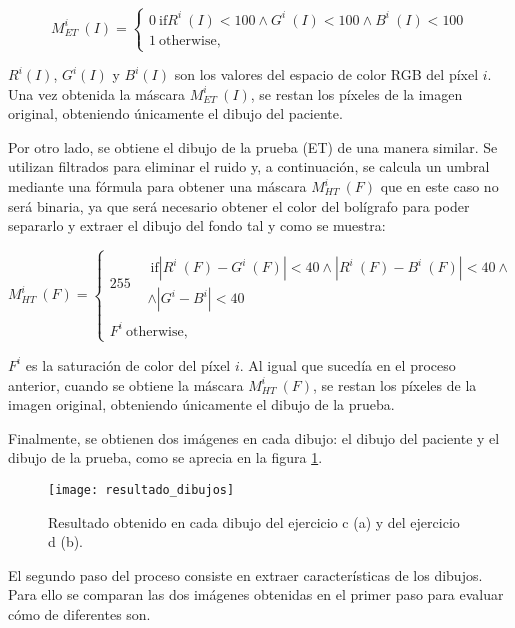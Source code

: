 \begin{equation}
	M^{i}_{ET}\ (I) = \left\lbrace\begin{array}{ll}
0~\text{if}R^{i}~(I)<100\wedge G^{i}~(I)<100\wedge B^{i}~(I)<100 \\ 1~\text{otherwise,} \end{array}\right.
\end{equation}

\(R^{i}(I)\), \(G^{i}(I)\) y \(B^{i}(I)\) son los valores del espacio de color RGB del píxel \(i\). Una vez obtenida la máscara \(M^{i}_{ET}\ (I)\), se restan los píxeles de la imagen original, obteniendo únicamente el dibujo del paciente.

Por otro lado, se obtiene el dibujo de la prueba (ET) de una manera similar. Se utilizan filtrados para eliminar el ruido y, a continuación, se calcula un umbral mediante una fórmula para obtener una máscara \(M^{i}_{HT}\ (F)\) que en este caso no será binaria, ya que será necesario obtener el color del bolígrafo para poder separarlo y extraer el dibujo del fondo tal y como se muestra:
 
\begin{equation}
	M^{i}_{HT}\ (F) = \left\lbrace\begin{array}{ll}
		255\begin{split}&~\text{if}|R^{i}~(F)-G^{i}~(F)|<40\wedge |R^{i}~(F)-B^{i}~(F)|<40\wedge \\ & \wedge|G^{i}-B^{i}|<40 \end{split} \\ F^i~\text{otherwise,} \end{array}\right.
\end{equation}

\(F^{i}\) es la saturación de color del píxel \(i\). Al igual que sucedía en el proceso anterior, cuando se  obtiene la máscara \(M^{i}_{HT}\ (F)\), se restan los píxeles de la imagen original, obteniendo únicamente el dibujo de la prueba.

Finalmente, se obtienen dos imágenes en cada dibujo: el dibujo del paciente y el dibujo de la prueba, como se aprecia en la figura \ref{fig:resultado}.

\begin{figure}[ht]
	\texttt{[image: resultado\_dibujos]}
	\caption{Resultado obtenido en cada dibujo del ejercicio c (a) y del ejercicio d (b).\cite{pereira2016new}}
	\label{fig:resultado}
\end{figure}

El segundo paso del proceso consiste en extraer características de los dibujos. Para ello se comparan las dos imágenes obtenidas en el primer paso para evaluar cómo de diferentes son. 

